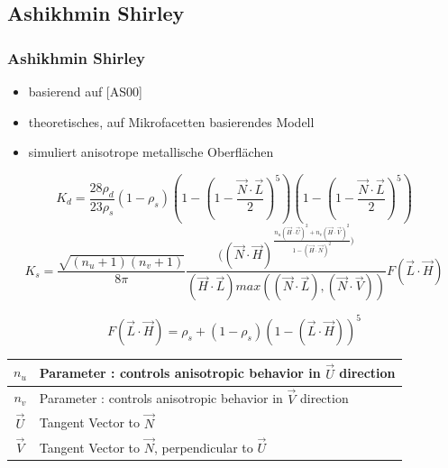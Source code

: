 \documentclass[11pt]{beamer}
\begin{document}
\subsection{Ashikhmin Shirley}
\begin{frame}[allowframebreaks]
\frametitle{Ashikhmin Shirley}
\begin{itemize}
\item basierend auf [AS00]
\item theoretisches, auf Mikrofacetten basierendes Modell
\item simuliert anisotrope metallische Oberflächen
\end{itemize}

\begin{equation}
K_d = \frac{28 \rho_d}{23 \rho_s} (1 - \rho_s)\left(1-\left(1- \frac{\vec{N} \cdot \vec{L}}{2}\right)^5\right)\left(1-\left(1-\frac{\vec{N} \cdot \vec{L}}{2}\right)^5\right)
\end{equation}
\begin{equation}
K_s = \frac{\sqrt{(n_u+1)(n_v+1)}}{8\pi} \frac{((\vec{N} \cdot \vec{H})^{ \frac{n_u(\vec{H} \cdot \vec{U})^2 + n_v(\vec{H} \cdot \vec{V})^2}{1-(\vec{H} \cdot \vec{N})^2})}}{(\vec{H} \cdot \vec{L}) max((\vec{N} \cdot \vec{L}),(\vec{N} \cdot \vec{V}))} F(\vec{L} \cdot \vec{H})
\end{equation}

\framebreak
\begin{equation}
F(\vec{L} \cdot \vec{H}) = \rho_s + (1-\rho_s)(1-(\vec{L} \cdot \vec{H}))^5
\end{equation}

\begin{table}[H]
\begin{tabular}{| c | l |}
\hline
$n_u$ & Parameter : controls anisotropic behavior in $\vec{U}$ direction\\ \hline
$n_v$ & Parameter : controls anisotropic behavior in $\vec{V}$ direction\\ \hline
$\vec{U}$ & Tangent Vector to $\vec{N}$\\ \hline
$\vec{V}$ & Tangent Vector to $\vec{N}$, perpendicular to $\vec{U}$\\ \hline
\end{tabular}
\end{table}

\framebreak

\begin{figure}[H]
\centering


\end{figure}
\end{frame}
\end{document}
